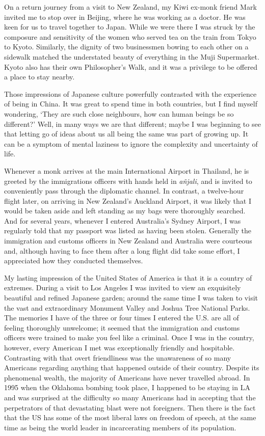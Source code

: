 On a return journey from a visit to New Zealand, my Kiwi ex-monk friend
Mark invited me to stop over in Beijing, where he was working as a
doctor. He was keen for us to travel together to Japan. While we were
there I was struck by the composure and sensitivity of the women who
served tea on the train from Tokyo to Kyoto. Similarly, the dignity of
two businessmen bowing to each other on a sidewalk matched the
understated beauty of everything in the Muji Supermarket. Kyoto also has
their own Philosopher's Walk\cite{walk}, and it was a privilege to be
offered a place to stay nearby.

Those impressions of Japanese culture powerfully contrasted with the
experience of being in China.
It was great to spend time in both countries, but I find myself wondering, `They
are such close neighbours, how can human beings be so different?'
Well, in many ways
we are that different; maybe I was beginning to see that letting go of
ideas about us all being the same was part of growing up. It can be a
symptom of mental laziness to ignore the complexity and uncertainty of
life.

Whenever a monk arrives at the main International Airport in Thailand,
he is greeted by the immigrations officers with hands held in
\emph{añjali}, and is invited to conveniently pass through the
diplomatic channel. In contrast, a twelve-hour flight later, on arriving
in New Zealand's Auckland Airport, it was likely that I would be taken
aside and left standing as my bags were thoroughly searched. And for
several years, whenever I entered Australia's Sydney Airport, I was
regularly told that my passport was listed as having been stolen.
Generally the immigration and customs officers in New Zealand and
Australia were courteous and, although having to face them after a long
flight did take some effort, I appreciated how they conducted
themselves.

My lasting impression of the United States of America
is that it is a country of extremes. During a visit to Los Angeles I was
invited to view an exquisitely beautiful and refined Japanese garden;
around the same time I was taken to visit the vast and extraordinary
Monument Valley\cite{monument} and Joshua Tree\cite{joshua}
National Parks. The memories I have of the three or
four times I entered the U.S. are all of feeling thoroughly unwelcome;
it seemed that the immigration and customs officers were trained to make
you feel like a criminal. Once I was in the country, however, every
American I met was exceptionally friendly and hospitable. Contrasting
with that overt friendliness was the unawareness of so many Americans
regarding anything that happened outside of their country. Despite its
phenomenal wealth, the majority of Americans have never travelled
abroad. In 1995 when the Oklahoma bombing\cite{oklahoma}
took place, I happened to be staying in LA and was
surprised at the difficulty so many Americans had in accepting that the
perpetrators of that devastating blast were not foreigners. Then there
is the fact that the US has some of the most liberal laws on freedom of
speech, at the same time as being the
world leader in incarcerating\cite{incarceration} members of its population.

